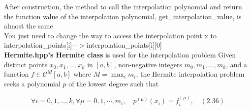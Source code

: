 \documentclass[a4paper]{article}
\begin{document}
After construction, the method to call the interpolation polynomial and return the function value of the interpolation polynomial, get\_interpolation\_value, is almost the same \\
You just need to change the way to access the interpolation point x to interpolation\_points[i]$->$interpolation\_points[i][0] \\
\textbf{Hermite.hpp's Hermite class} is used for the interpolation problem
Given distinct points $x_{0}, x_{1},\ldots, x_{k}$ in $[a, b]$, non-negative integers $m_{0}, m_{1},\ldots, m_{k}$, and a function $f\in\mathcal{C}^{M}[a, b]$ where $M=\max_{i} m_{i}$, the Hermite interpolation problem seeks a polynomial $p$ of the lowest degree such that

\[
\forall i=0,1,\ldots, k,\forall\mu=0,1,\cdots, m_{i}, \quad p^{(\mu)}(x_{i})=f_{i}^{(\mu)}, \quad (2.36)
\]
\end{document}
